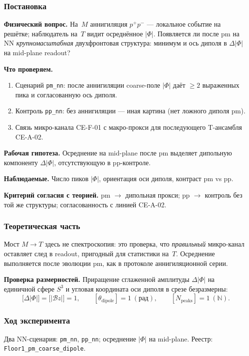 \label{exp:cea01}

\subsubsection*{Постановка}
\textbf{Физический вопрос.}
На~$M$ аннигиляция $p^+p^-$ --- локальное событие на решётке; наблюдатель на~$T$ видит осреднённое $|\Phi|$.
Появляется ли после pm на NN \emph{крупномасштабная} двухфронтовая структура: минимум и ось диполя в $\Delta|\Phi|$ на mid-plane readout?

\textbf{Что проверяем.}
\begin{enumerate}[label=\textbf{(\alph*)},leftmargin=*,itemsep=0.25em]
\item Сценарий \texttt{pm\_nn}: после аннигиляции coarse-поле $|\Phi|$ даёт $\ge 2$ выраженных пика и согласованную ось диполя.
\item Контроль \texttt{pp\_nn}: без аннигиляции --- иная картина (нет ложного диполя pm).
\item Связь микро-канала CE-F-01 с макро-прокси для последующего T-ансамбля CE-A-02.
\end{enumerate}

\textbf{Рабочая гипотеза.}
Осреднение на mid-plane после pm выделяет дипольную компоненту $\Delta|\Phi|$, отсутствующую в pp-контроле.

\textbf{Наблюдаемые.}
Число пиков $|\Phi|$, ориентация оси диполя, контраст pm vs pp.

\textbf{Критерий согласия с теорией.}
pm $\to$ дипольная прокси; pp $\to$ контроль без той же структуры; согласованность с линией CE-A-02.

\subsubsection*{Теоретическая часть}
Мост $M\to T$ здесь не спектроскопия: это проверка, что \emph{правильный} микро-канал оставляет след в readout, пригодный для статистики на~$T$.
Осреднение выполняется после эволюции pm, как в протоколе аннигиляционной серии.

\textbf{Проверка размерностей.}
Приращение сглаженной амплитуды $\Delta|\Phi|$ на единичной сфере $S^3$ и угловая координата оси диполя в срезе безразмерны:
\[
  \bigl[\Delta|\Phi|\bigr] = \bigl[|\mathcal{B}z|\bigr] = 1,\qquad
  [\theta_{\mathrm{dipole}}] = 1\ (\mathrm{рад}),\qquad
  [N_{\mathrm{peaks}}] = 1\ (\mathbb{N}).
\]

\subsubsection*{Ход эксперимента}
Два NN-сценария: \texttt{pm\_nn}, \texttt{pp\_nn}; осреднение $|\Phi|$ на mid-plane.
Реестр: \texttt{Floor1\_pm\_coarse\_dipole}.

